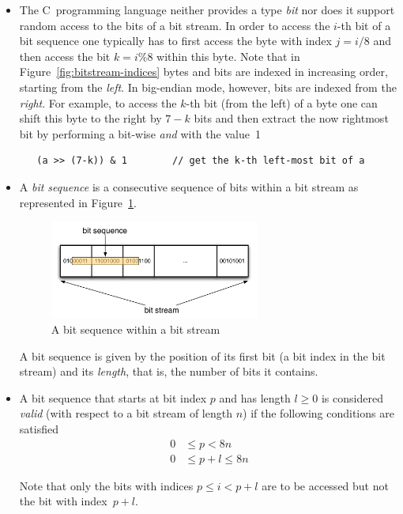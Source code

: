 \begin{itemize}
\item 
The C~programming language neither provides a type \emph{bit}
nor does it support random access to the bits of a bit stream.
In order to access the $i$-th bit of a bit sequence one typically
has to first access the byte with index $j = i/8$ and then access the 
bit $k = i \% 8$ within this byte.
Note that in Figure~\ref{fig:bitstream-indices} 
bytes and bits are indexed in increasing order, starting from the \emph{left}.
In big-endian mode, however, bits are indexed from the \emph{right}.
For example, to access the $k$-th bit (from the left) of a byte  one can
shift this byte to the right by $7-k$ bits and then extract the now
rightmost bit by performing a bit-wise \emph{and} with the value~1
%
\begin{verbatim}
   (a >> (7-k)) & 1        // get the k-th left-most bit of a
\end{verbatim}

\item
A \emph{bit sequence} is a consecutive sequence of bits within a bit stream
as represented in Figure~\ref{fig:bitsequence}.
\begin{figure}[hbt]
\begin{center}
\includegraphics[width=0.65\textwidth]{figures/bit_sequence.pdf}
\caption{\label{fig:bitsequence} A bit sequence within a bit stream}
\end{center}
\end{figure}

A bit sequence is given by the position of its first bit (a bit index in the bit stream)
and its \emph{length}, that is, the number of bits it contains.

\item

A bit sequence that starts at bit index $p$ and has
length $l \geq 0$ is considered \emph{valid} (with respect to a bit stream of length $n$)
if the following conditions are satisfied
\begin{align*}
  0 &\leq p < 8n \\
  0 &\leq p + l \leq 8n
\end{align*}

Note that only the bits with indices $p \leq i < p + l$ are to be accessed
but not the bit with index~$p+l$.

\end{itemize}


